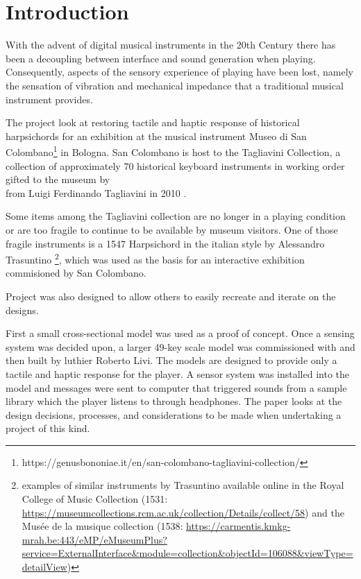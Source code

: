 \section{Introduction}\label{introduction}

With the advent of digital musical instruments in the 20th Century there
has been a decoupling between interface and sound generation when
playing. Consequently, aspects of the sensory experience of playing have
been lost, namely the sensation of vibration and mechanical impedance
that a traditional musical instrument provides.

The project look at restoring tactile and haptic response of historical
harpsichords for an exhibition at the musical instrument Museo di San
Colombano\footnote{https://genusbononiae.it/en/san-colombano-tagliavini-collection/}
in Bologna. San Colombano is host to the Tagliavini Collection, a
collection of approximately 70 historical keyboard instruments in
working order \cite{Tagliavini2007} gifted to the museum by\\
from Luigi Ferdinando Tagliavini in 2010
\cite{SanColombano2010,Carlino2010}.

Some items among the Tagliavini collection are no longer in a playing
condition or are too fragile to continue to be available by museum
visitors. One of those fragile instruments is a 1547 Harpsichord in the
italian style by Alessandro Trasuntino
\cite{Wraight2024}\footnote{examples of similar instruments by
Trasuntino available online in the Royal College of Music Collection (1531:
\url{https://museumcollections.rcm.ac.uk/collection/Details/collect/58}) and the
Musée de la musique collection (1538:
\url{https://carmentis.kmkg-mrah.be:443/eMP/eMuseumPlus?service=ExternalInterface&module=collection&objectId=106088&viewType=detailView})
}, which was used as the basis for an interactive exhibition commisioned
by San Colombano.

Project was also designed to allow others to easily recreate and iterate
on the designs.

First a small cross-sectional model was used as a proof of concept. Once
a sensing system was decided upon, a larger 49-key scale model was
commissioned with and then built by luthier Roberto Livi. The models are
designed to provide only a tactile and haptic response for the player. A
sensor system was installed into the model and messages were sent to
computer that triggered sounds from a sample library which the player
listens to through headphones. The paper looks at the design decisions,
processes, and considerations to be made when undertaking a project of
this kind.


